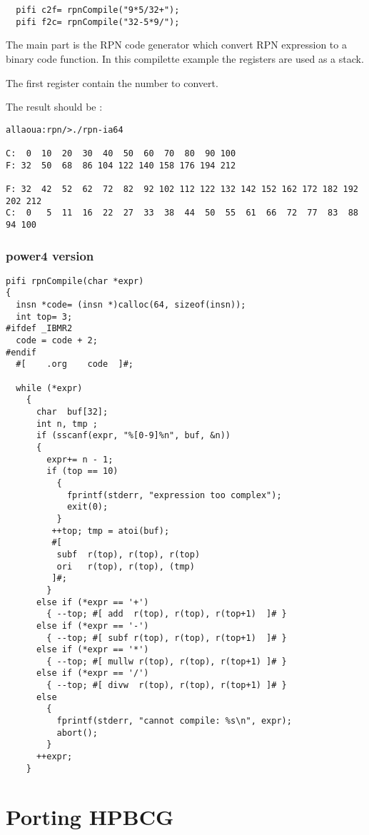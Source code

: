 \documentclass{article}
\newcommand{\hpbcg}{\textbf{HPBCG}\ }
\begin{document}
\begin{verbatim}
  pifi c2f= rpnCompile("9*5/32+");
  pifi f2c= rpnCompile("32-5*9/");
\end{verbatim}

The main part is the RPN code generator which convert RPN expression
to a binary code function. In this compilette example the registers
are used as a stack.

The first register contain the number to  convert.

The result should be :
\begin{verbatim}
allaoua:rpn/>./rpn-ia64 

C:  0  10  20  30  40  50  60  70  80  90 100 
F: 32  50  68  86 104 122 140 158 176 194 212 

F: 32  42  52  62  72  82  92 102 112 122 132 142 152 162 172 182 192 202 212 
C:  0   5  11  16  22  27  33  38  44  50  55  61  66  72  77  83  88  94 100 
\end{verbatim}

\subsubsection{power4 version}

\begin{lstlisting}
pifi rpnCompile(char *expr)
{
  insn *code= (insn *)calloc(64, sizeof(insn));
  int top= 3;
#ifdef _IBMR2
  code = code + 2;
#endif
  #[    .org    code  ]#;

  while (*expr)
    {
      char  buf[32];
      int n, tmp ;
      if (sscanf(expr, "%[0-9]%n", buf, &n))
      {
        expr+= n - 1;
        if (top == 10)
          {
            fprintf(stderr, "expression too complex");
            exit(0);
          }
         ++top; tmp = atoi(buf);
         #[
          subf  r(top), r(top), r(top)
          ori   r(top), r(top), (tmp)  
         ]#;
        }
      else if (*expr == '+')
        { --top; #[ add  r(top), r(top), r(top+1)  ]# }
      else if (*expr == '-')
        { --top; #[ subf r(top), r(top), r(top+1)  ]# }
      else if (*expr == '*')
        { --top; #[ mullw r(top), r(top), r(top+1) ]# }
      else if (*expr == '/')
        { --top; #[ divw  r(top), r(top), r(top+1) ]# }
      else
        {
          fprintf(stderr, "cannot compile: %s\n", expr);
          abort();
        }
      ++expr;
    }
\end{lstlisting}

\section{Porting \hpbcg}
\end{document}
